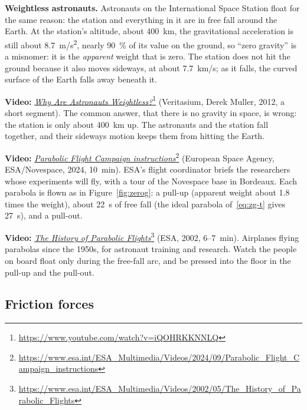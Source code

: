 \documentclass[11pt,a4paper]{article}
\begin{document}
\begin{aside}
\textbf{Weightless astronauts.} Astronauts on the International Space Station float for the same
reason: the station and everything in it are in free fall around the Earth. At the station's
altitude, about \qty{400}{km}, the gravitational acceleration is still about \qty{8.7}{m/s^2}, nearly
\qty{90}{\percent} of its value on the ground, so ``zero gravity'' is a misnomer: it is the
\emph{apparent} weight that is zero. The station does not hit the ground because it also moves
sideways, at about \qty{7.7}{km/s}; as it falls, the curved surface of the Earth falls away beneath it.
\par\smallskip
\textbf{Video:}
\href{https://www.youtube.com/watch?v=iQOHRKKNNLQ}{\emph{Why Are Astronauts
Weightless?}}\footnote{\url{https://www.youtube.com/watch?v=iQOHRKKNNLQ}} (Veritasium, Derek
Muller, 2012, a short segment). The common answer, that there is no gravity in space, is wrong: the
station is only about \qty{400}{km} up. The astronauts and the station fall together, and their
sideways motion keeps them from hitting the Earth.
\par\smallskip
\textbf{Video:}
\href{https://www.esa.int/ESA_Multimedia/Videos/2024/09/Parabolic_Flight_Campaign_instructions}{\emph{Parabolic
Flight Campaign instructions}}\footnote{\url{https://www.esa.int/ESA_Multimedia/Videos/2024/09/Parabolic_Flight_Campaign_instructions}}
(European Space Agency, ESA/Novespace, 2024, 10~min). ESA's flight coordinator briefs the
researchers whose experiments will fly, with a tour of the Novespace base in Bordeaux. Each
parabola is flown as in Figure~\ref{fig:zerog}: a pull-up (apparent weight about 1.8 times the
weight), about \qty{22}{s} of free fall (the ideal parabola of~\eqref{eq:zg-t} gives \qty{27}{s}),
and a pull-out.
\par\smallskip
\textbf{Video:}
\href{https://www.esa.int/ESA_Multimedia/Videos/2002/05/The_History_of_Parabolic_Flights}{\emph{The
History of Parabolic
Flights}}\footnote{\url{https://www.esa.int/ESA_Multimedia/Videos/2002/05/The_History_of_Parabolic_Flights}}
(ESA, 2002, 6--7~min). Airplanes flying parabolas since the 1950s, for astronaut training and
research. Watch the people on board float only during the free-fall arc, and be pressed into the
floor in the pull-up and the pull-out.
\end{aside}

\subsection{Friction forces}\label{sec:friction}
\end{document}
